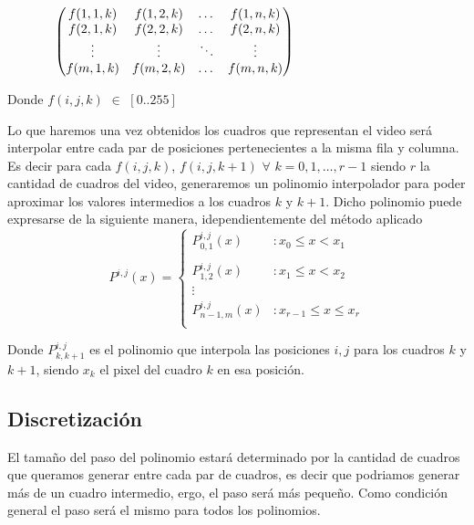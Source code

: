 $
\hspace{1.3cm}
     \begin{pmatrix}
      f(1, 1, k) & f(1, 2, k) & \dots & f(1, n, k) \\
	  f(2, 1, k) & f(2, 2, k) & \dots & f(2, n, k) \\
	  \vdots & \vdots & \ddots & \vdots \\
	  f(m, 1, k) & f(m, 2, k) & \dots & f(m, n, k) \\
     \end{pmatrix}
$

\vspace{4mm}

Donde $f(i, j, k)$ $\in$ $[0..255]$

Lo que haremos una vez obtenidos los cuadros que representan el video será interpolar entre cada par de posiciones pertenecientes a la misma fila y columna. Es decir para cada $f(i, j, k)$, $f(i, j, k+1)$ $\forall$ $k = 0, 1, \dots, r-1$ siendo $r$ la cantidad de cuadros del video, generaremos un polinomio interpolador para poder aproximar los valores intermedios a los cuadros $k$ y $k+1$. Dicho polinomio puede expresarse de la siguiente manera, idependientemente del método aplicado 
\vspace{4mm}
\begin{displaymath}
   P^{i,j}(x) = \left\{
     \begin{array}{lr}
       P_{0,1}^{i,j}(x)  & : x_0 \leq x < x_1\\\\
       P_{1,2}^{i,j}(x)  & : x_1 \leq x < x_2\\
       \vdots\\
       P_{n-1,m}^{i,j}(x)  & : x_{r-1} \leq x \leq x_r\\
     \end{array}
   \right.
\end{displaymath} 

Donde $P^{i,j}_{k,k+1}$ es el polinomio que interpola las posiciones $i, j$ para los cuadros $k$ y $k+1$, siendo $x_k$ el pixel del cuadro $k$ en esa posición.

\subsection{Discretización}

El tamaño del paso del polinomio estará determinado por la cantidad de cuadros que queramos generar entre cada par de cuadros, es decir que podriamos generar más de un cuadro intermedio, ergo, el paso será más pequeño. Como condición general el paso será el mismo para todos los polinomios. 

